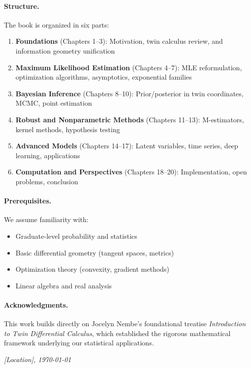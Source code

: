 \documentclass[11pt,twoside]{book}
\theoremstyle{plain}
\theoremstyle{definition}
\theoremstyle{remark}
\begin{document}
\paragraph{Structure.} The book is organized in six parts:
\begin{enumerate}
    \item \textbf{Foundations} (Chapters 1--3): Motivation, twin calculus review, and information geometry unification
    \item \textbf{Maximum Likelihood Estimation} (Chapters 4--7): MLE reformulation, optimization algorithms, asymptotics, exponential families
    \item \textbf{Bayesian Inference} (Chapters 8--10): Prior/posterior in twin coordinates, MCMC, point estimation
    \item \textbf{Robust and Nonparametric Methods} (Chapters 11--13): M-estimators, kernel methods, hypothesis testing
    \item \textbf{Advanced Models} (Chapters 14--17): Latent variables, time series, deep learning, applications
    \item \textbf{Computation and Perspectives} (Chapters 18--20): Implementation, open problems, conclusion
\end{enumerate}

\paragraph{Prerequisites.} We assume familiarity with:
\begin{itemize}
    \item Graduate-level probability and statistics
    \item Basic differential geometry (tangent spaces, metrics)
    \item Optimization theory (convexity, gradient methods)
    \item Linear algebra and real analysis
\end{itemize}

\paragraph{Acknowledgments.} This work builds directly on Jocelyn Nembe's foundational treatise \textit{Introduction to Twin Differential Calculus}, which established the rigorous mathematical framework underlying our statistical applications.

\vspace{1cm}
\hfill \textit{[Location], \today}
\end{document}
